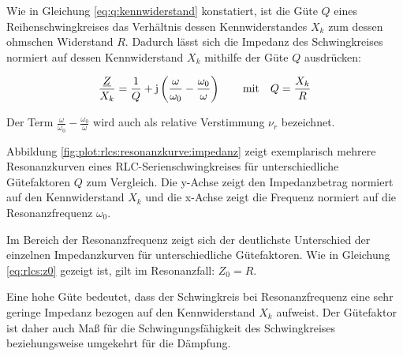 \begin{frame}[t]
{%
Wie in Gleichung \ref{eq:q:kennwiderstand} konstatiert, ist die Güte $Q$ eines Reihenschwingkreises 
das Verhältnis dessen Kennwiderstandes $X_k$ zum dessen ohmschen Widerstand $R$. 
Dadurch lässt sich die Impedanz des Schwingkreises normiert auf dessen Kennwiderstand $X_k$ mithilfe der Güte $Q$ ausdrücken:

\begin{equation}\label{eq:rlcs:znorm}
    \frac{\underline{Z}}{X_k} = \frac{1}{Q} + \mathrm{j}\left(\frac{\omega}{\omega_0} - \frac{\omega_0}{\omega}\right) \vphantom{\Big|}
    \qquad\text{mit}\quad Q = \frac{X_k}{R}
\end{equation}

%
Der Term $\frac{\omega}{\omega_0} - \frac{\omega_0}{\omega}$ wird auch als relative Verstimmung $\nu_r$ bezeichnet.\cite{hagmann}

Abbildung \ref{fig:plot:rlcs:resonanzkurve:impedanz} zeigt exemplarisch mehrere Resonanzkurven eines RLC-Serienschwingkreises für unterschiedliche Gütefaktoren $Q$ zum Vergleich.
Die y-Achse zeigt den Impedanzbetrag normiert auf den Kennwiderstand $X_k$ und die x-Achse zeigt die Frequenz normiert auf die Resonanzfrequenz $\omega_0$. 

Im Bereich der Resonanzfrequenz zeigt sich der deutlichste Unterschied der einzelnen Impedanzkurven für unterschiedliche Gütefaktoren.
Wie in Gleichung \ref{eq:rlcs:z0} gezeigt ist, gilt im Resonanzfall: $Z_0 = R$.

Eine hohe Güte bedeutet, dass der Schwingkreis bei Resonanzfrequenz eine sehr geringe Impedanz bezogen auf den Kennwiderstand $X_k$ aufweist.
Der Gütefaktor ist daher auch Maß für die Schwingungsfähigkeit des Schwingkreises beziehungsweise umgekehrt für die Dämpfung.

}
\end{frame}
